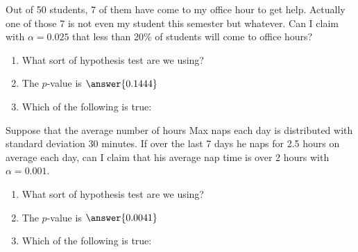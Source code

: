 \documentclass{ximera}
\begin{document}
\begin{problem}
Out of 50 students, 7 of them have come to my office hour to get help.  Actually one of those 7 is not even my student this semester but whatever. Can I claim with $\alpha=0.025$ that less than 20\% of students will come to office hours?

  
  \begin{enumerate}
\item What sort of hypothesis test are we using?

\begin{multipleChoice}
\end{multipleChoice}

\item  The $p$-value is $\answer{0.1444}$

\item Which of the following is true:
\begin{multipleChoice}
\end{multipleChoice}

\end{enumerate}

  

\end{problem}


\begin{problem}
Suppose that the average number of hours Max naps each day is distributed with standard deviation 30 minutes.  If over the last 7 days he naps for 2.5 hours on average each day, can I claim that his average nap time is over 2 hours with $\alpha=0.001$.


  \begin{enumerate}
\item What sort of hypothesis test are we using?

\begin{multipleChoice}
\end{multipleChoice}

\item  The $p$-value is $\answer{0.0041}$

\item Which of the following is true:
\begin{multipleChoice}
\end{multipleChoice}

\end{enumerate}



\end{problem}
\end{document}
